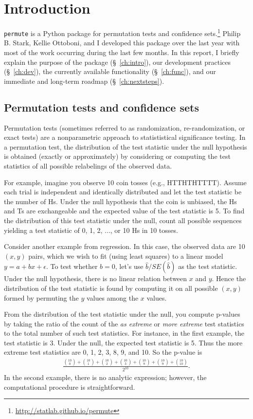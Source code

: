 \chapter{\label{ch:intro}Introduction}

\texttt{permute} is a Python package for permutation tests and confidence
sets.\footnote{\url{http://statlab.github.io/permute}}
Philip B. Stark, Kellie Ottoboni, and I developed this package over the
last year with most of the work occurring during the last few months.
In this report, I briefly explain the purpose of the package (\S~\ref{ch:intro}), our
development practices (\S~\ref{ch:dev}), the currently available functionality (\S~\ref{ch:func}), and
our immediate and long-term roadmap (\S~\ref{ch:nextsteps}).

\section{Permutation tests and confidence sets}

Permutation tests (sometimes referred to as randomization, re-randomization, or
exact tests) are a nonparametric approach to statististical significance
testing.  In a permutation test, the distribution of the test statistic under
the null hypothesis is obtained (exactly or approximately) by considering or
computing the test statistics of all possible relabelings of the observed data.

For example, imagine you observe 10 coin tosses (e.g., HTTHTHTTTT). Assume 
each trial is independent and identically distributed and let the
test statistic be the number of Hs. Under the null hypothesis that the
coin is unbiased, the Hs and Ts are exchangeable and the expected value of the
test statistic is 5. To find the distribution of this test statistic under the
null, count all possible sequences yielding a test statistic of 0,
1, 2, ..., or 10 Hs in 10 tosses.

Consider another example from regression.  In this case, the observed data are
10 $(x, y)$ pairs, which we wish to fit (using least squares) to a linear model
$y = a + bx + \epsilon$.  To test whether $b = 0$, let's use
$\hat{b}/SE(\hat{b})$ as the test statistic.  Under the null hypothesis, there
is no linear relation between $x$ and $y$. Hence the distribution of the test
statistic is found by computing it on all possible $(x, y)$ formed by permuting
the $y$ values among the $x$ values.

From the distribution of the test statistic under the null, you compute
p-values by taking the ratio of the count of the \emph{as extreme} or
\emph{more extreme} test statistics to the total number of such test
statistics.  For instance, in the first example, the test statistic is 3.
Under the null, the expected test statistic is 5.  Thus the more extreme test
statistics are 0, 1, 2, 3, 8, 9, and 10. So the p-value is
\begin{align*}
\frac{\binom{10}{0} + \binom{10}{1} + \binom{10}{2} + \binom{10}{3} +
   \binom{10}{8} + \binom{10}{9} + \binom{10}{10}}{2^{10}}.
\end{align*}
In the second example, there is no analytic expression; however, the
computational procedure is straightforward.

